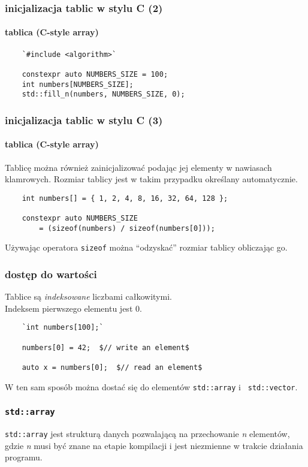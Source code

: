 \documentclass[aspectratio=169]{beamer}
\begin{document}
\begin{frame}[fragile]
    \frametitle{inicjalizacja tablic w stylu C (2)}
    \framesubtitle{tablica (C-style array)}

    {\footnotesize
    \begin{lstlisting}
    `#include <algorithm>`

    constexpr auto NUMBERS_SIZE = 100;
    int numbers[NUMBERS_SIZE];
    std::fill_n(numbers, NUMBERS_SIZE, 0);
    \end{lstlisting}}
\end{frame}

\begin{frame}[fragile]
    \frametitle{inicjalizacja tablic w stylu C (3)}
    \framesubtitle{tablica (C-style array)}

    Tablicę można również zainicjalizować podając jej elementy w nawiasach
    klamrowych. Rozmiar tablicy jest w takim przypadku określany automatycznie.

    {\footnotesize
    \begin{lstlisting}
    int numbers[] = { 1, 2, 4, 8, 16, 32, 64, 128 };

    constexpr auto NUMBERS_SIZE
        = (sizeof(numbers) / sizeof(numbers[0]));
    \end{lstlisting}}

    Używając operatora {\tt sizeof} można ``odzyskać'' rozmiar tablicy
    obliczając go.
\end{frame}

\begin{frame}[fragile]
    \frametitle{dostęp do wartości}

    Tablice są \emph{indeksowane} liczbami całkowitymi.\\
    Indeksem pierwszego elementu jest 0.

    {\footnotesize
    \begin{lstlisting}
    `int numbers[100];`

    numbers[0] = 42;  $// write an element$

    auto x = numbers[0];  $// read an element$
    \end{lstlisting}}

    W ten sam sposób można dostać się do elementów {\tt std::array} i {\tt
    std::vector}.
\end{frame}

\begin{frame}
    \frametitle{{\tt std::array}}

    {\tt std::array} jest strukturą danych pozwalającą na przechowanie \emph{n}
    elementów, gdzie \emph{n} musi być znane na etapie kompilacji i jest
    niezmienne w trakcie działania programu.
\end{frame}
\end{document}
